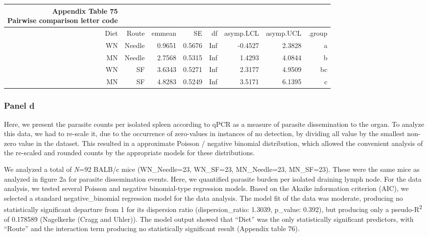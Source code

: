 \documentclass[
  12pt,
  letterpaper,
]{article}
\begin{document}
\begin{longtable}{rrrrrrrr}
\caption*{
{\large \textbf{Appendix Table 75}} \\ 
{\small \textbf{Pairwise comparison letter code}}
} \\ 
\toprule
Diet & Route & emmean & SE & df & asymp.LCL & asymp.UCL & .group \\ 
\midrule\addlinespace[2.5pt]
WN & Needle & 0.9651 & 0.5676 & Inf & -0.4527 & 2.3828 &  a   \\ 
MN & Needle & 2.7568 & 0.5315 & Inf & 1.4293 & 4.0844 &   b  \\ 
WN & SF & 3.6343 & 0.5271 & Inf & 2.3177 & 4.9509 &   bc \\ 
MN & SF & 4.8283 & 0.5249 & Inf & 3.5171 & 6.1395 &    c \\ 
\bottomrule
\end{longtable}

\subsubsection{Panel d}\label{panel-d}

Here, we present the parasite counts per isolated spleen according to qPCR as a measure of parasite dissemination to the organ. To analyze this data, we had to re-scale it, due to the occurrence of zero-values in instances of no detection, by dividing all value by the smallest non-zero value in the dataset. This resulted in a approximate Poisson / negative binomial distribution, which allowed the convenient analysis of the re-scaled and rounded counts by the appropriate models for these distributions.

We analyzed a total of \emph{N}=92 BALB/c mice (WN\_Needle=23, WN\_SF=23, MN\_Needle=23, MN\_SF=23). These were the same mice as analyzed in figure 2a for parasite dissemination events. Here, we quantified parasite burden per isolated draining lymph node. For the data analysis, we tested several Poisson and negative binomial-type regression models. Based on the Akaike information criterion (AIC), we selected a standard negative\_binomial regression model for the data analysis. The model fit of the data was moderate, producing no statistically significant departure from 1 for its dispersion ratio (dispersion\_ratio: 1.3039, p\_value: 0.392), but producing only a pseudo-R\textsuperscript{2} of 0.178589 (Nagelkerke (Cragg and Uhler)). The model output showed that ``Diet'' was the only statistically significant predictors, with ``Route'' and the interaction term producing no statistically significant result (Appendix table 76).
\end{document}
